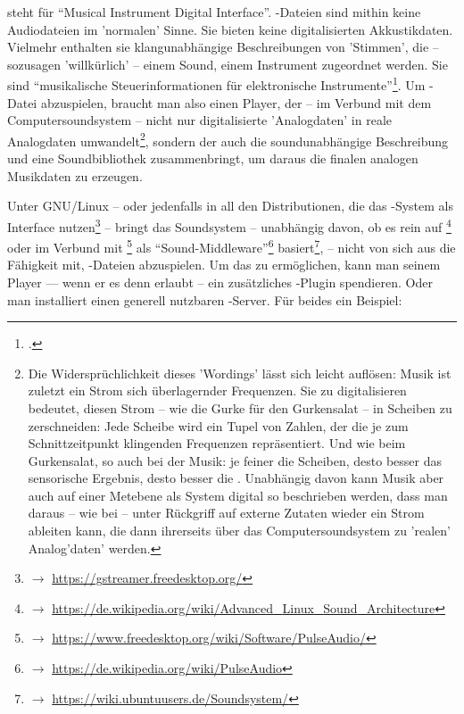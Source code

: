  steht für \enquote{Musical Instrument Digital Interface}.
-Dateien sind mithin keine Audiodateien im 'normalen' Sinne. Sie
bieten keine digitalisierten Akkustikdaten. Vielmehr enthalten sie
klangunabhängige Beschreibungen von 'Stimmen', die -- sozusagen 'willkürlich' --
einem Sound, einem Instrument zugeordnet werden. Sie sind \enquote{musikalische
Steuerinformationen für elektronische Instrumente}\footcite[vgl. dazu][\nopage
wp]{WpedMidi2019a}. Um -Datei abzuspielen, braucht man also einen
Player, der -- im Verbund mit dem Computersoundsystem -- nicht nur
digitalisierte 'Analogdaten' in reale Analogdaten umwandelt\footnote{Die
Widersprüchlichkeit dieses 'Wordings' lässt sich leicht auflösen:
Musik ist zuletzt ein Strom sich überlagernder Frequenzen. Sie zu digitalisieren
bedeutet, diesen Strom -- wie die Gurke für den Gurkensalat -- in Scheiben zu
zerschneiden: Jede Scheibe wird ein Tupel von Zahlen, der die je zum
Schnittzeitpunkt klingenden Frequenzen repräsentiert. Und wie beim Gurkensalat,
so auch bei der Musik: je feiner die Scheiben, desto besser das sensorische
Ergebnis, desto besser die . Unabhängig davon
kann Musik aber auch auf einer Metebene als System digital so beschrieben
werden, dass man daraus -- wie bei  -- unter Rückgriff auf externe
Zutaten wieder ein Strom  ableiten kann, die
dann ihrerseits über das Computersoundsystem zu 'realen' Analog'daten' werden.},
sondern der auch die soundunabhängige Beschreibung und eine Soundbibliothek
zusammenbringt, um daraus die finalen analogen Musikdaten zu erzeugen.

Unter GNU/Linux -- oder jedenfalls in all den Distributionen, die das
-System als Interface nutzen\footnote{$\rightarrow$
\href{https://gstreamer.freedesktop.org/}{https://gstreamer.freedesktop.org/}}
-- bringt das Soundsystem -- unabhängig davon, ob es rein auf
\footnote{$\rightarrow$
\href{https://de.wikipedia.org/wiki/Advanced{\_}Linux{\_}Sound{\_}Architecture}
{https://de.wikipedia.org/wiki/Advanced{\_}Linux{\_}Sound{\_}Architecture}} oder
im Verbund mit \footnote{$\rightarrow$
\href{https://www.freedesktop.org/wiki/Software/PulseAudio/}
{https://www.freedesktop.org/wiki/Software/PulseAudio/}} als
\enquote{Sound-Middleware}\footnote{$\rightarrow$
\href{https://de.wikipedia.org/wiki/PulseAudio}
{https://de.wikipedia.org/wiki/PulseAudio}} basiert\footnote{$\rightarrow$
\href{https://wiki.ubuntuusers.de/Soundsystem/}{https://wiki.ubuntuusers.de/Soundsystem/}},
-- nicht von sich aus die Fähigkeit mit, -Dateien abzuspielen.
Um das zu ermöglichen, kann man seinem Player --- wenn er es denn erlaubt -- ein
zusätzliches -Plugin spendieren. Oder man installiert einen generell
nutzbaren -Server. Für beides ein Beispiel:

